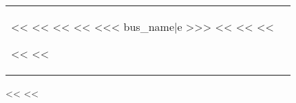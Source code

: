 \begin{tabular}{ @{} p{105mm} @{} p{105mm} @{} }
\begin{minipage}[b][38.8mm][t]{93mm}
                            <<%
                            <<%
                                <<%
                            <<%
                            <<< bus_name|e >>>
                        <<%
                    <<%
                <<%
            \end{minipage}%
            \vspace*{6mm}%
            <<%
        <<%
        \end{tabular}
        \clearpage
    <<%
<<%
